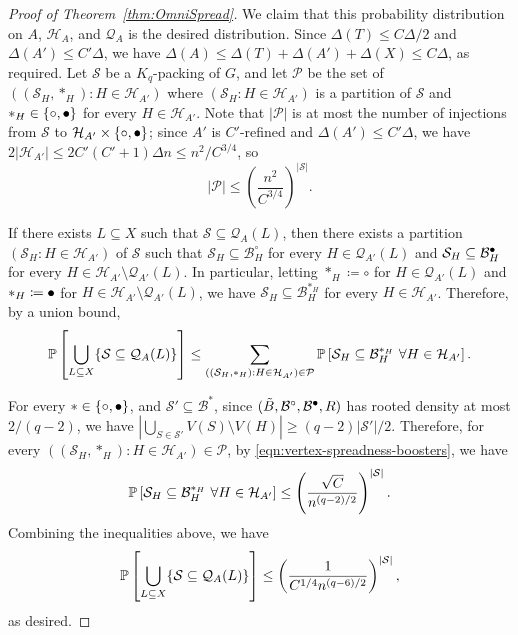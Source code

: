 \documentclass[11pt]{article}
\numberwithin{equation}{section}
\newcounter{i}
\theoremstyle{plain}
\theoremstyle{plain} %
\theoremstyle{definition}
\newcommand{\cQ}{\mathcal{Q}}
\newcommand{\cB}{\mathcal{B}}
\newcommand{\cS}{\mathcal{S}}
\newcommand{\cH}{\mathcal{H}}
\newcommand{\cP}{\mathcal{P}}
\newcommand{\Prob}[1]{\ensuremath{%
\mathbb P\left[#1\right]
}}
\newcommand\filledcirc{\ensuremath{{\bullet}\mathllap{\circ}}}
\begin{document}
\begin{proof}[Proof of Theorem~\ref{thm:OmniSpread}]
    We claim that this probability distribution on $A$, $\cH_A$, and $\cQ_A$ is the desired distribution.  Since $\Delta(T) \leq C\Delta/2$ and $\Delta(A') \leq C'\Delta$, we have $\Delta(A) \leq \Delta(T) + \Delta(A') + \Delta(X) \leq C\Delta$, as required.  Let $\cS$ be a $K_q$-packing of $G$, and let $\cP$ be the set of $((\cS_H, *_H) : H \in \cH_{A'})$ where $(\cS_H : H \in \cH_{A'})$ is a partition of $\cS$ and $*_H \in \{\circ, \filledcirc\}$ for every $H \in \cH_{A'}$.  Note that $|\cP|$ is at most the number of injections from $\cS$ to $\cH_{A'}\times\{\circ,\filledcirc\}$; since $A'$ is $C'$-refined and $\Delta(A') \leq C'\Delta$, we have $2|\cH_{A'}| \leq 2C'(C' + 1)\Delta n \leq n^2 / C^{3/4}$, so
    \begin{equation*}
      |\cP| \leq \left(\frac{n^2}{C^{3/4}}\right)^{|\cS|}.
    \end{equation*}
    
    If there exists $L \subseteq X$ such that $\cS \subseteq \cQ_A(L)$, then there exists a partition $(\cS_H : H \in \cH_{A'})$ of $\cS$ such that $\cS_H \subseteq \cB^{\circ}_H$ for every $H \in \cQ_{A'}(L)$ and $\cS_H \subseteq \cB^{\filledcirc}_H$ for every $H \in \cH_{A'}\setminus\cQ_{A'}(L)$.  In particular, letting $*_H \coloneqq \circ$ for $H \in \cQ_{A'}(L)$ and $*_H\coloneqq\filledcirc$ for $H \in \cH_{A'}\setminus\cQ_{A'}(L)$, we have $\cS_H \subseteq \cB^{*_H}_H$ for every $H \in \cH_{A'}$.  Therefore, by a union bound,
    \begin{equation*}
     \Prob{\bigcup_{L\subseteq X}\{\cS \subseteq \cQ_A(L)\}}  \leq \sum_{((\cS_H, *_H) : H \in \cH_{A'})\in\cP}\Prob{\cS_H \subseteq \cB^{*_H}_H~\forall H \in \cH_{A'}}.
    \end{equation*}

     For every $*\in\{\circ,\filledcirc\}$, and $\cS' \subseteq \cB^{*}$, since $(\tilde B, \cB^{\circ}, \cB^{\filledcirc}, R)$ has rooted density at most $2 / (q - 2)$, we have $|\bigcup_{S\in \cS'}V(S)\setminus V(H)| \geq (q - 2)|\cS'| / 2.$  Therefore, for every $((\cS_H, *_H) : H \in \cH_{A'})\in\cP$, by \eqref{eqn:vertex-spreadness-boosters}, we have 
    \begin{equation*}
      \Prob{\cS_H \subseteq \cB^{*_H}_H~\forall H \in \cH_{A'}} \leq \left(\frac{\sqrt C}{n^{{(q - 2})/{2}}}\right)^{|\cS|}.
    \end{equation*}
    Combining the inequalities above, we have    
    \begin{equation*}
      \Prob{\bigcup_{L\subseteq X}\{\cS \subseteq \cQ_A(L)\}} \le \left(\frac{1}{C^{1/4}n^{(q - 6)/2}}\right)^{|\cS|},
    \end{equation*}
      as desired.
\end{proof}
\end{document}
